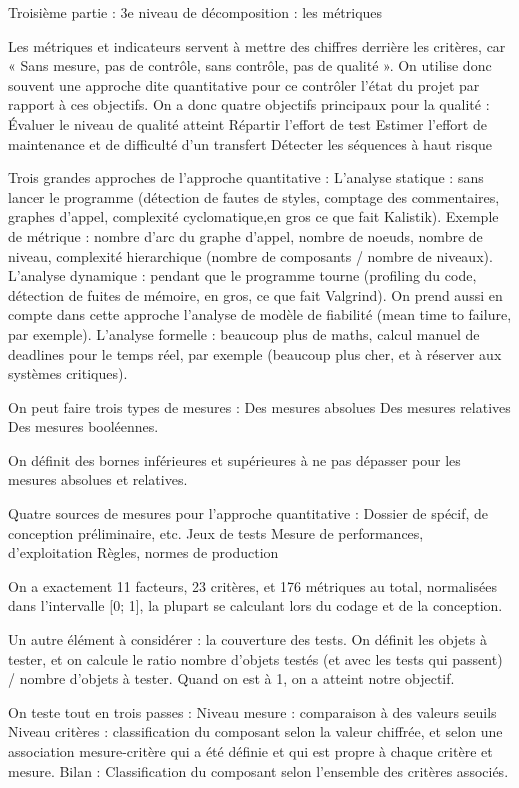Troisième partie : 3e niveau de décomposition : les métriques

Les métriques et indicateurs servent à mettre des chiffres derrière les critères, car « Sans mesure, pas de contrôle, sans contrôle, pas de qualité ».
On utilise donc souvent une approche dite quantitative pour ce contrôler l’état du projet par rapport à ces objectifs. 
On a donc quatre objectifs principaux pour la qualité :
Évaluer le niveau de qualité atteint
Répartir l’effort de test
Estimer l’effort de maintenance et de difficulté d’un transfert
Détecter les séquences à haut risque


Trois grandes approches de l’approche quantitative :
L’analyse statique : sans lancer le programme (détection de fautes de styles, comptage des commentaires, graphes d’appel, complexité cyclomatique,en gros ce que fait Kalistik). Exemple de métrique : nombre d’arc du graphe d’appel, nombre de noeuds, nombre de niveau, complexité hierarchique (nombre de composants / nombre de niveaux).
L’analyse dynamique : pendant que le programme tourne (profiling du code, détection de fuites de mémoire, en gros, ce que fait Valgrind). On prend aussi en compte dans cette approche l’analyse de modèle de fiabilité (mean time to failure, par exemple).
L’analyse formelle : beaucoup plus de maths, calcul manuel de deadlines pour le temps réel, par exemple (beaucoup plus cher, et à réserver aux systèmes critiques).

On peut faire trois types de mesures :
Des mesures absolues
Des mesures relatives
Des mesures booléennes.

On définit des bornes inférieures et supérieures à ne pas dépasser pour les mesures absolues et relatives.

Quatre sources de mesures pour l’approche quantitative :
Dossier de spécif, de conception préliminaire, etc.
Jeux de tests
Mesure de performances, d’exploitation
Règles, normes de production


On a exactement 11 facteurs, 23 critères, et 176 métriques au total, normalisées dans l’intervalle [0; 1], la plupart se calculant lors du codage et de la conception.

Un autre élément à considérer : la couverture des tests.
On définit les objets à tester, et on calcule le ratio nombre d’objets testés (et avec les tests qui passent) / nombre d’objets à tester. Quand on est à 1, on a atteint notre objectif.

On teste tout en trois passes :
Niveau mesure : comparaison à des valeurs seuils
Niveau critères : classification du composant selon la valeur chiffrée, et selon une association mesure-critère qui a été définie et qui est propre à chaque critère et mesure.
Bilan : Classification du composant selon l’ensemble des critères associés.


